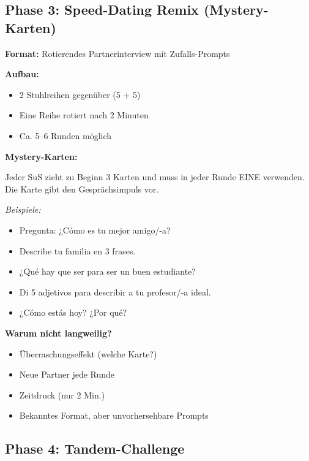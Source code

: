 \documentclass[11pt,a4paper]{article}
\begin{document}
\subsection{Phase 3: Speed-Dating Remix (Mystery-Karten)}

\begin{gamebox}
\textbf{Format:} Rotierendes Partnerinterview mit Zufalls-Prompts

\textbf{Aufbau:}
\begin{itemize}
    \item 2 Stuhlreihen gegenüber (5 + 5)
    \item Eine Reihe rotiert nach 2 Minuten
    \item Ca. 5--6 Runden möglich
\end{itemize}

\textbf{Mystery-Karten:}

Jeder SuS zieht zu Beginn 3 Karten und muss in jeder Runde EINE verwenden. Die Karte gibt den Gesprächsimpuls vor.

\textit{Beispiele:}
\begin{itemize}
    \item \glqq{}Pregunta: ¿Cómo es tu mejor amigo/-a?\grqq{}
    \item \glqq{}Describe tu familia en 3 frases.\grqq{}
    \item \glqq{}¿Qué hay que ser para ser un buen estudiante?\grqq{}
    \item \glqq{}Di 5 adjetivos para describir a tu profesor/-a ideal.\grqq{}
    \item \glqq{}¿Cómo estás hoy? ¿Por qué?\grqq{}
\end{itemize}

\textbf{Warum nicht langweilig?}
\begin{itemize}
    \item Überraschungseffekt (welche Karte?)
    \item Neue Partner jede Runde
    \item Zeitdruck (nur 2 Min.)
    \item Bekanntes Format, aber unvorhersehbare Prompts
\end{itemize}
\end{gamebox}

\subsection{Phase 4: Tandem-Challenge}
\end{document}

